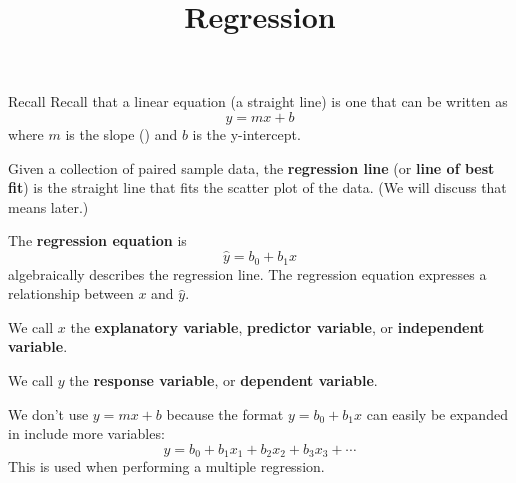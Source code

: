 \documentclass{beamer}
\title[MA205 - Section 10.2]{Regression}
\begin{document}
\begin{frame}
\titlepage
\end{frame}

\begin{frame}
\begin{block}{Recall}
Recall that a linear equation (a straight line) is one that can be written as
\begin{equation*}
y=mx+b
\end{equation*}
where $m$ is the slope () and $b$ is the y-intercept.
\end{block}\pause

\begin{definition}
Given a collection of paired sample data, the \textbf{regression line} (or \textbf{line of best fit}) is the straight line that  fits the scatter plot of the data. (We will discuss that  means later.)
\end{definition}
\end{frame}

\begin{frame}
\begin{definition}
The \textbf{regression equation} is 
\begin{equation*}
\hat{y}=b_0+b_1 x
\end{equation*}
 algebraically describes the regression line. The regression equation expresses a relationship between $x$ and $\hat{y}$.
\end{definition}\pause

\begin{definition}
We call $x$ the \textbf{explanatory variable}, \textbf{predictor variable}, or \textbf{independent variable}.
\end{definition}\pause

\begin{definition}
We call $y$ the \textbf{response variable}, or \textbf{dependent variable}.
\end{definition}
\end{frame}

\begin{frame}
\begin{note}
We don't use $y=mx+b$ because the format $y=b_0+b_1 x$ can easily be expanded in include more variables:
\begin{equation*}
y=b_0+b_1 x_1 + b_2 x_2 + b_3 x_3 + \cdots
\end{equation*}
This is used when performing a multiple regression.
\end{note}
\end{frame}
\end{document}
